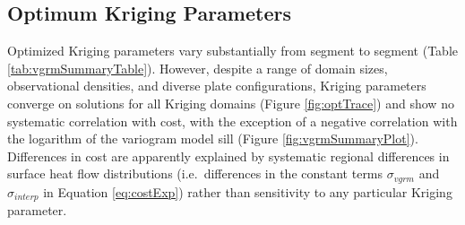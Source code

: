 \hypertarget{optimum-kriging-parameters}{%
\subsection{Optimum Kriging Parameters}\label{optimum-kriging-parameters}}

Optimized Kriging parameters vary substantially from segment to segment (Table \ref{tab:vgrmSummaryTable}). However, despite a range of domain sizes, observational densities, and diverse plate configurations, Kriging parameters converge on solutions for all Kriging domains (Figure \ref{fig:optTrace}) and show no systematic correlation with cost, with the exception of a negative correlation with the logarithm of the variogram model sill (Figure \ref{fig:vgrmSummaryPlot}). Differences in cost are apparently explained by systematic regional differences in surface heat flow distributions (i.e.~differences in the constant terms \(\sigma_{vgrm}\) and \(\sigma_{interp}\) in Equation \eqref{eq:costExp}) rather than sensitivity to any particular Kriging parameter.

